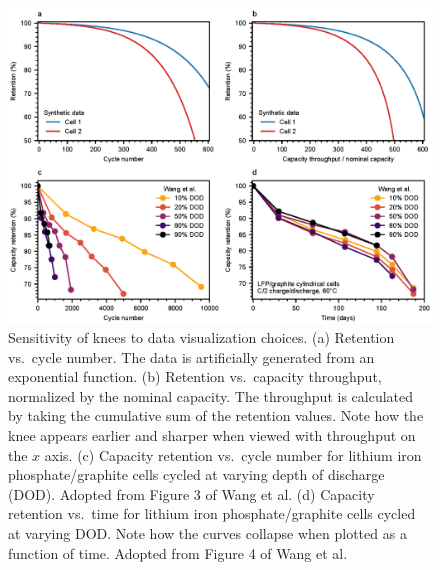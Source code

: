 \documentclass[journal=jpclcd,manuscript=article]{achemso}
\begin{document}
\begin{figure}[!ht]
\centering
\includegraphics[scale=1]{figures/x_axis_sensitivity.eps}
\caption{Sensitivity of knees to data visualization choices.
(a) Retention vs.~cycle number. The data is artificially generated from an exponential function. 
(b) Retention vs.~capacity throughput, normalized by the nominal capacity. The throughput is calculated by taking the cumulative sum of the retention values.
Note how the knee appears earlier and sharper when viewed with throughput on the $x$ axis.
(c) Capacity retention vs.~cycle number for lithium iron phosphate/graphite cells cycled at varying depth of discharge (DOD). Adopted from Figure 3 of Wang et al.\cite{wang_cycle-life_2011}
(d) Capacity retention vs.~time for lithium iron phosphate/graphite cells cycled at varying DOD.
Note how the curves collapse when plotted as a function of time.
Adopted from Figure 4 of Wang et al.\cite{wang_cycle-life_2011}
}
\label{fig:x_axis}
\end{figure}
\end{document}
